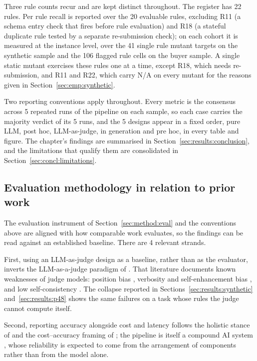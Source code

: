 Three rule counts recur and are kept distinct throughout. The register has 22 rules. Per rule recall is reported over the 20 evaluable rules, excluding R11 (a schema entry check that fires before rule evaluation) and R18 (a stateful duplicate rule tested by a separate re-submission check); on each cohort it is measured at the instance level, over the 41 single rule mutant targets on the synthetic sample and the 106 flagged rule cells on the buyer sample. A single static mutant exercises these rules one at a time, except R18, which needs re-submission, and R11 and R22, which carry N/A on every mutant for the reasons given in Section~\ref{sec:emp:synthetic}.

Two reporting conventions apply throughout. Every metric is the consensus across 5 repeated runs of the pipeline on each sample, so each case carries the majority verdict of its 5 runs, and the 5 designs appear in a fixed order, pure LLM, post hoc, LLM-as-judge, in generation and pre hoc, in every table and figure. The chapter's findings are summarised in Section~\ref{sec:results:conclusion}, and the limitations that qualify them are consolidated in Section~\ref{sec:concl:limitations}.


\subsection{Evaluation methodology in relation to prior work}
\label{sec:results:evalrelated}

The evaluation instrument of Section~\ref{sec:method:eval} and the conventions above are aligned with how comparable work evaluates, so the findings can be read against an established baseline. There are 4 relevant strands.

First, using an LLM-as-judge design as a baseline, rather than as the evaluator, inverts the LLM-as-a-judge paradigm of \citet{zheng2023}. That literature documents known weaknesses of judge models: position bias \citep{wang2024fair}, verbosity and self-enhancement bias \citep{zheng2023}, and low self-consistency \citep{ye2024justice}. The collapse reported in Sections~\ref{sec:results:synthetic} and~\ref{sec:results:p48} shows the same failures on a task whose rules the judge cannot compute itself.

Second, reporting accuracy alongside cost and latency follows the holistic stance of \citet{liang2023holistic} and the cost--accuracy framing of \citet{chen2023frugalgpt}; the pipeline is itself a compound AI system \citep{zaharia2024compound}, whose reliability is expected to come from the arrangement of components rather than from the model alone.


